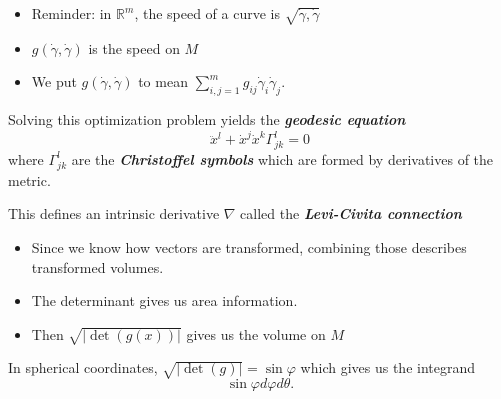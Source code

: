 \documentclass[UKenglish]{beamer}
\newcommand\boldgreen[1]{\textcolor{lighter_csu_green}{\emph{\textbf{#1}}}}
\newcommand{\R}{\mathbb{R}}
\begin{document}
\begin{frame}{}
	\vfill
	\begin{itemize}
		\item Reminder: in $\R^m$, the speed of a curve is $\sqrt{\dot{\gamma},\dot{\gamma}}$
		\pause
		\item $g(\dot{\gamma},\dot{\gamma})$ is the speed on $M$
		\pause
		\item We put $g(\dot{\gamma},\dot{\gamma})$ to mean $\sum_{i,j=1}^m g_{ij} \dot{\gamma}_i \dot{\gamma}_j$.
	\end{itemize}
	\vfill
\end{frame} 

\begin{frame}{}
\vfill
\begin{figure}[H]
	\centering
	\def\svgwidth{.75\columnwidth}
	
\end{figure}
\end{frame}

\begin{frame}{}
	\vfill
	Solving this optimization problem yields the \boldgreen{geodesic equation}
	\[
		\ddot{x}^l +\dot{x}^j\dot{x}^k \Gamma_{jk}^l = 0
	\]
	where $\Gamma_{jk}^l$ are the \boldgreen{Christoffel symbols} which are formed by derivatives of the metric.
	\vfill
\end{frame}

\begin{frame}{}
	\vfill
	This defines an intrinsic derivative $\nabla$ called the \boldgreen{Levi-Civita connection}
	\vfill
\end{frame}

\begin{frame}{}
	\vfill
	\begin{itemize}
		\item Since we know how vectors are transformed, combining those describes transformed volumes.
		\pause
		\item The determinant gives us area information.
		\pause
		\item Then $\sqrt{|\det(g(x))|}$ gives us the volume on $M$
	\end{itemize}
	\vfill
\end{frame}

\begin{frame}{}
	\vfill
	In spherical coordinates, $\sqrt{|\det(g)|} = \sin \varphi$ which gives us the integrand
	\[
		\sin\varphi d\varphi d\theta.
	\]
	\vfill
\end{frame}

\begin{frame}{}
\vfill
\begin{figure}[H]
	\hspace*{-2cm}
	\def\svgwidth{1.2\columnwidth}
	
\end{figure}
\end{frame}
\end{document}
